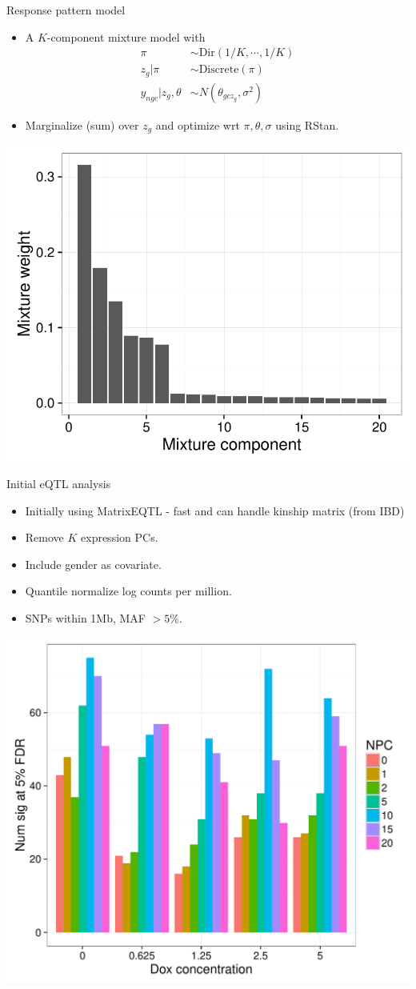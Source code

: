 \documentclass{beamer}
\begin{document}
\begin{frame}{Response pattern model}
\begin{itemize}
\item A $K$-component mixture model with
\begin{align*}
\pi &\sim \text{Dir}(1/K,\cdots,1/K) \\
z_g | \pi &\sim \text{Discrete}(\pi) \\
y_{ngc} | z_g, \theta &\sim N( \theta_{gcz_g}, \sigma^2 )
\end{align*}
\item Marginalize (sum) over $z_g$ and optimize wrt $\pi, \theta, \sigma$ using RStan. 
\end{itemize}
\centering
\includegraphics[width=.4\textwidth,clip,trim=0 0 0 0]{../figures/mixture_pi.pdf}
\end{frame}

\begin{frame}{Initial eQTL analysis}
\begin{itemize}
\item Initially using MatrixEQTL - fast and can handle kinship matrix (from IBD)
\item Remove $K$ expression PCs.
\item Include gender as covariate. 
\item Quantile normalize log counts per million. 
\item SNPs within 1Mb, MAF $>5\%$. 
\end{itemize}
\centering
\includegraphics[width=.6\textwidth,clip,trim=0 0 0 0]{../figures/matrixEQTL_nsig.pdf}
\end{frame}
\end{document}
